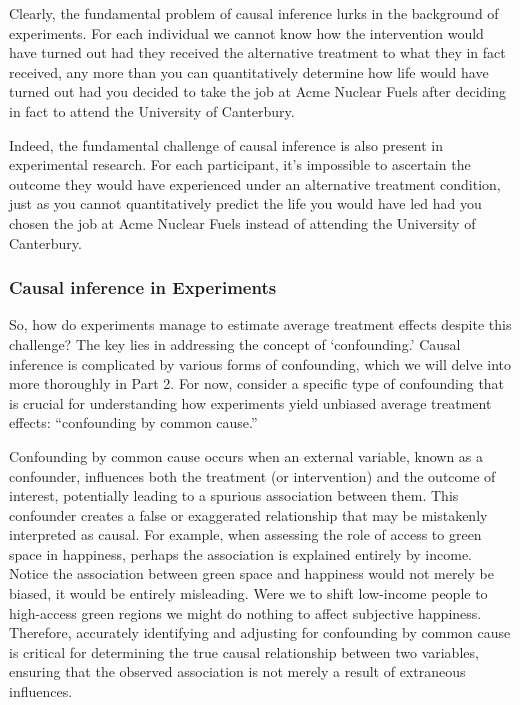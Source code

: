\documentclass[
  singlecolumn]{article}
\begin{document}
Clearly, the fundamental problem of causal inference lurks in the
background of experiments. For each individual we cannot know how the
intervention would have turned out had they received the alternative
treatment to what they in fact received, any more than you can
quantitatively determine how life would have turned out had you decided
to take the job at Acme Nuclear Fuels after deciding in fact to attend
the University of Canterbury.

Indeed, the fundamental challenge of causal inference is also present in
experimental research. For each participant, it's impossible to
ascertain the outcome they would have experienced under an alternative
treatment condition, just as you cannot quantitatively predict the life
you would have led had you chosen the job at Acme Nuclear Fuels instead
of attending the University of Canterbury.

\subsubsection{Causal inference in
Experiments}\label{causal-inference-in-experiments}

So, how do experiments manage to estimate average treatment effects
despite this challenge? The key lies in addressing the concept of
`confounding.' Causal inference is complicated by various forms of
confounding, which we will delve into more thoroughly in Part 2. For
now, consider a specific type of confounding that is crucial for
understanding how experiments yield unbiased average treatment effects:
``confounding by common cause.''

Confounding by common cause occurs when an external variable, known as a
confounder, influences both the treatment (or intervention) and the
outcome of interest, potentially leading to a spurious association
between them. This confounder creates a false or exaggerated
relationship that may be mistakenly interpreted as causal. For example,
when assessing the role of access to green space in happiness, perhaps
the association is explained entirely by income. Notice the association
between green space and happiness would not merely be biased, it would
be entirely misleading. Were we to shift low-income people to
high-access green regions we might do nothing to affect subjective
happiness. Therefore, accurately identifying and adjusting for
confounding by common cause is critical for determining the true causal
relationship between two variables, ensuring that the observed
association is not merely a result of extraneous influences.
\end{document}
